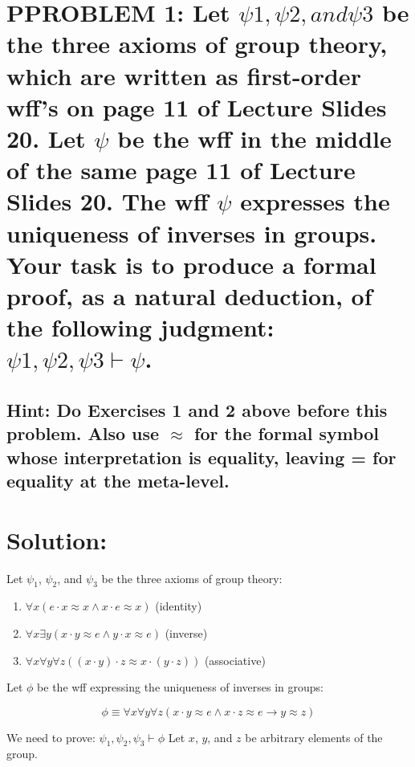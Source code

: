 \documentclass{article}
\newcommand{\proves}{\vdash}
\begin{document}
\newpage
\section*{PPROBLEM 1: Let $\psi1, \psi2, and \psi3$ be the three axioms of group theory, which are written as
first-order wff’s on page 11 of Lecture Slides 20. Let $\psi$ be the wff in the middle of the same page
11 of Lecture Slides 20. The wff $\psi$ expresses the uniqueness of inverses in groups. Your task is to
produce a formal proof, as a natural deduction, of the following judgment:
$\psi1, \psi2, \psi3 \vdash \psi$.}

\subsection*{
Hint: Do Exercises 1 and 2 above before this problem. Also use $\approx$ for the formal symbol whose
interpretation is equality, leaving = for equality at the meta-level.
}


\section*{Solution:}
Let $\psi_1$, $\psi_2$, and $\psi_3$ be the three axioms of group theory:

\begin{enumerate}
    \item $\forall x (e \cdot x \approx x \wedge x \cdot e \approx x)$ (identity)
    \item $\forall x \exists y (x \cdot y \approx e \wedge y \cdot x \approx e)$ (inverse)
    \item $\forall x \forall y \forall z ((x \cdot y) \cdot z \approx x \cdot (y \cdot z))$ (associative)
\end{enumerate}

Let $\phi$ be the wff expressing the uniqueness of inverses in groups:

\[\phi \equiv \forall x \forall y \forall z (x \cdot y \approx e \wedge x \cdot z \approx e \to y \approx z)\]

We need to prove: $\psi_1, \psi_2, \psi_3 \proves \phi$
Let $x$, $y$, and $z$ be arbitrary elements of the group.
\end{document}
